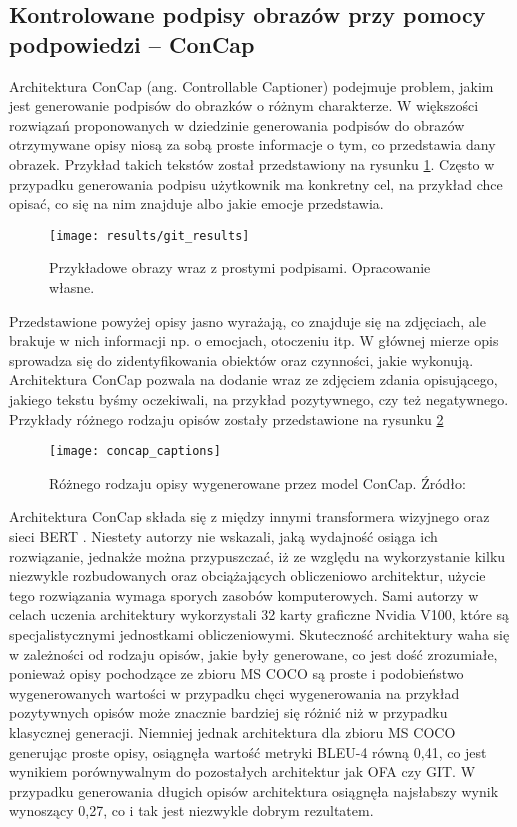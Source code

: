 \subsection{Kontrolowane podpisy obrazów przy pomocy podpowiedzi -- ConCap}
Architektura ConCap \cite{concap} (ang. Controllable Captioner) podejmuje problem, jakim jest generowanie podpisów do obrazków o różnym charakterze. W większości rozwiązań proponowanych w dziedzinie generowania podpisów do obrazów otrzymywane opisy niosą za sobą proste informacje o tym, co przedstawia dany obrazek. Przykład takich tekstów został przedstawiony na rysunku \ref{fig:sample-captions}. Często w przypadku generowania podpisu użytkownik ma konkretny cel, na przykład chce opisać, co się na nim znajduje albo jakie emocje przedstawia.
\begin{figure}[H]
  \centering
  \texttt{[image: results/git\_results]}
  \caption{Przykładowe obrazy wraz z prostymi podpisami. Opracowanie własne.}
  \label{fig:sample-captions}
\end{figure}
\noindent Przedstawione powyżej opisy jasno wyrażają, co znajduje się na zdjęciach, ale brakuje w nich informacji np. o emocjach, otoczeniu itp. W głównej mierze opis sprowadza się do zidentyfikowania obiektów oraz czynności, jakie wykonują. Architektura ConCap pozwala na dodanie wraz ze zdjęciem zdania opisującego, jakiego tekstu byśmy oczekiwali, na przykład pozytywnego, czy też negatywnego. Przykłady różnego rodzaju opisów zostały przedstawione na rysunku \ref{fig:concap-captions}
\begin{figure}[H]
  \centering
  \texttt{[image: concap\_captions]}
  \caption{Różnego rodzaju opisy wygenerowane przez model ConCap. Źródło: \cite{concap}}
  \label{fig:concap-captions}
\end{figure}
\noindent Architektura ConCap składa się z między innymi transformera wizyjnego oraz sieci BERT \cite{bert}. Niestety autorzy nie wskazali, jaką wydajność osiąga ich rozwiązanie, jednakże można przypuszczać, iż ze względu na wykorzystanie kilku niezwykle rozbudowanych oraz obciążających obliczeniowo architektur, użycie tego rozwiązania wymaga sporych zasobów komputerowych. Sami autorzy w celach uczenia architektury wykorzystali 32 karty graficzne Nvidia V100, które są specjalistycznymi jednostkami obliczeniowymi. Skuteczność architektury waha się w zależności od rodzaju opisów, jakie były generowane, co jest dość zrozumiałe, ponieważ opisy pochodzące ze zbioru MS COCO są proste i podobieństwo wygenerowanych wartości w przypadku chęci wygenerowania na przykład pozytywnych opisów może znacznie bardziej się różnić niż w przypadku klasycznej generacji. Niemniej jednak architektura dla zbioru MS COCO generując proste opisy, osiągnęła wartość metryki BLEU-4 równą 0,41, co jest wynikiem porównywalnym do pozostałych architektur jak OFA czy GIT. W przypadku generowania długich opisów architektura osiągnęła najsłabszy wynik wynoszący 0,27, co i tak jest niezwykle dobrym rezultatem.

